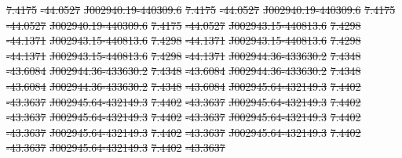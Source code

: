\documentclass[11pt, a4paper]{book}
\providecommand{\DIFdeltex}[1]{{\protect\color{red}\sout{#1}}}                      %
\providecommand{\DIFdel}[1]{\texorpdfstring{\DIFdeltex{#1}}{}} %
\begin{document}
\DIFdel{7.4175 }%
\DIFdel{-44.0527 }%
\DIFdel{J002940.19-440309.6 }%
\DIFdel{7.4175 }%
\DIFdel{-44.0527 }%
\DIFdel{J002940.19-440309.6 }%
\DIFdel{7.4175 }%
\DIFdel{-44.0527 }%
\DIFdel{J002940.19-440309.6 }%
\DIFdel{7.4175 }%
\DIFdel{-44.0527}%
\DIFdel{J002943.15-440813.6 }%
\DIFdel{7.4298 }%
\DIFdel{-44.1371 }%
\DIFdel{J002943.15-440813.6 }%
\DIFdel{7.4298 }%
\DIFdel{-44.1371 }%
\DIFdel{J002943.15-440813.6 }%
\DIFdel{7.4298 }%
\DIFdel{-44.1371 }%
\DIFdel{J002943.15-440813.6 }%
\DIFdel{7.4298 }%
\DIFdel{-44.1371}%
\DIFdel{J002944.36-433630.2 }%
\DIFdel{7.4348 }%
\DIFdel{-43.6084 }%
\DIFdel{J002944.36-433630.2 }%
\DIFdel{7.4348 }%
\DIFdel{-43.6084 }%
\DIFdel{J002944.36-433630.2 }%
\DIFdel{7.4348 }%
\DIFdel{-43.6084 }%
\DIFdel{J002944.36-433630.2 }%
\DIFdel{7.4348 }%
\DIFdel{-43.6084}%
\DIFdel{J002945.64-432149.3 }%
\DIFdel{7.4402 }%
\DIFdel{-43.3637 }%
\DIFdel{J002945.64-432149.3 }%
\DIFdel{7.4402 }%
\DIFdel{-43.3637 }%
\DIFdel{J002945.64-432149.3 }%
\DIFdel{7.4402 }%
\DIFdel{-43.3637 }%
\DIFdel{J002945.64-432149.3 }%
\DIFdel{7.4402 }%
\DIFdel{-43.3637}%
\DIFdel{J002945.64-432149.3 }%
\DIFdel{7.4402 }%
\DIFdel{-43.3637 }%
\DIFdel{J002945.64-432149.3 }%
\DIFdel{7.4402 }%
\DIFdel{-43.3637 }%
\DIFdel{J002945.64-432149.3 }%
\DIFdel{7.4402 }%
\DIFdel{-43.3637 }%
\DIFdel{J002945.64-432149.3 }%
\DIFdel{7.4402 }%
\DIFdel{-43.3637}%
\end{document}
